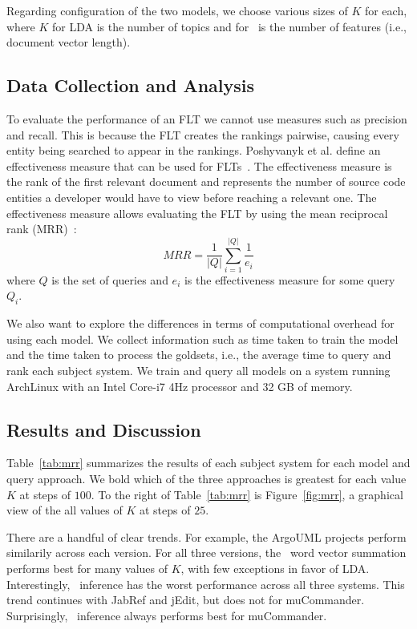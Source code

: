 Regarding configuration of the two models, we choose various sizes of $K$ for
each, where $K$ for LDA is the number of topics and for \dv\ is the number of
features (i.e., document vector length).


\subsection{Data Collection and Analysis}

To evaluate the performance of an FLT we cannot use measures such as precision
and recall. This is because the FLT creates the rankings pairwise, causing every
entity being searched to appear in the rankings.  Poshyvanyk et al. define an
effectiveness measure that can be used for FLTs~\cite{Poshyvanyk-etal_2007}.
The effectiveness measure is the rank of the first relevant document and
represents the number of source code entities a developer would have to view
before reaching a relevant one.  The effectiveness measure allows evaluating the
FLT by using the mean reciprocal rank (MRR)~\cite{Voorhees_1999}: %
\begin{equation}
    MRR = \frac{1}{|Q|} \sum_{i=1}^{|Q|} \frac{1}{e_i}
\end{equation}
where $Q$ is the set of queries and $e_i$ is the effectiveness measure for some
query $Q_i$.

We also want to explore the differences in terms of computational overhead for
using each model.  We collect information such as time taken to train the model
and the time taken to process the goldsets, i.e., the average time to query and
rank each subject system. We train and query all models on a system running
ArchLinux with an Intel Core-i7 4Hz processor and 32 GB of memory.

\subsection{Results and Discussion}





Table~\ref{tab:mrr} summarizes the results of each subject system for each model
and query approach. We bold which of the three approaches is greatest for each
value $K$ at steps of $100$. To the right of Table~\ref{tab:mrr} is
Figure~\ref{fig:mrr}, a graphical view of the all values of $K$ at steps of
$25$.

There are a handful of clear trends. For example, the ArgoUML projects perform
similarily across each version. For all three versions, the \dv\ word vector
summation performs best for many values of $K$, with few exceptions in favor of
LDA.  Interestingly, \dv\ inference has the worst performance across all three
systems. This trend continues with JabRef and jEdit, but does not for
muCommander.  Surprisingly, \dv\ inference always performs best for muCommander.

